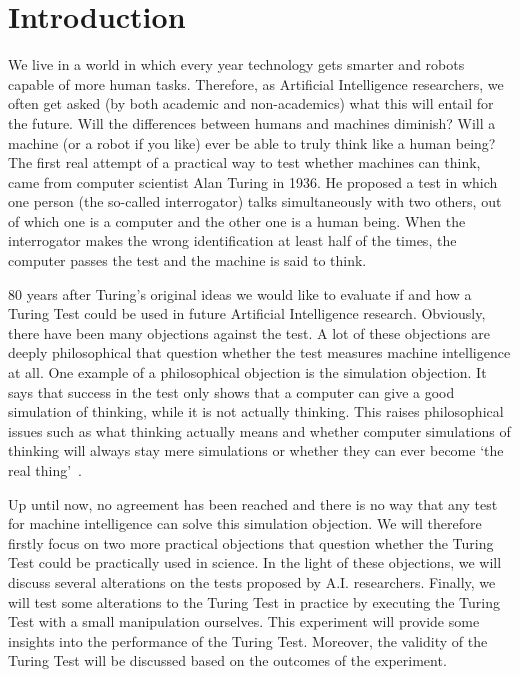 \section{Introduction}
We live in a world in which every year technology gets smarter and robots capable of more human tasks. Therefore, as Artificial Intelligence researchers, we often get asked (by both academic and non-academics) what this will entail for the future. Will the differences between humans and machines diminish? Will a machine (or a robot if you like) ever be able to truly think like a human being? The first real attempt of a practical way to test whether machines can think, came from computer scientist Alan Turing in 1936. He proposed a test in which one person (the so-called interrogator) talks simultaneously with two others, out of which one is a computer and the other one is a human being. When the interrogator makes the wrong identification at least half of the times, the computer passes the test and the machine is said to think.

80 years after Turing’s original ideas we would like to evaluate if and how a Turing Test could be used in future Artificial Intelligence research. Obviously, there have been many objections against the test. A lot of these objections are deeply philosophical that question whether the test measures machine intelligence at all. One example of a philosophical objection is the simulation objection. It says that success in the test only shows that a computer can give a good simulation of thinking, while it is not actually thinking. This raises philosophical issues such as what thinking actually means and whether computer simulations of thinking will always stay mere simulations or whether they can ever become ‘the real thing’~\cite{copeland2015artificial}.

     Up until now, no agreement has been reached and there is no way that any test for machine intelligence can solve this simulation objection. We will therefore firstly focus on two more practical objections that question whether the Turing Test could be practically used in science. In the light of these objections, we will discuss several alterations on the tests proposed by A.I. researchers. Finally, we will test some alterations to the Turing Test in practice by executing the Turing Test with a small manipulation ourselves. This experiment will provide some insights into the performance of the Turing Test. Moreover, the validity of the Turing Test will be discussed based on the outcomes of the experiment.

